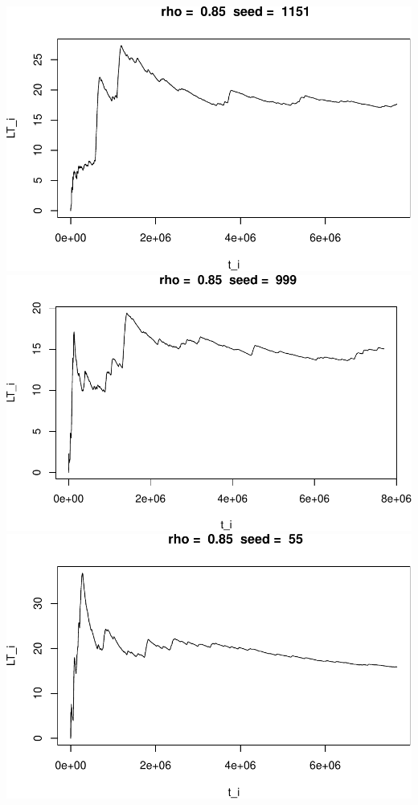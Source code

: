 \documentclass[]{article}
\begin{document}
\includegraphics{003_files/figure-latex/unnamed-chunk-21-4.pdf}
\includegraphics{003_files/figure-latex/unnamed-chunk-21-5.pdf}
\includegraphics{003_files/figure-latex/unnamed-chunk-21-6.pdf}
\end{document}
